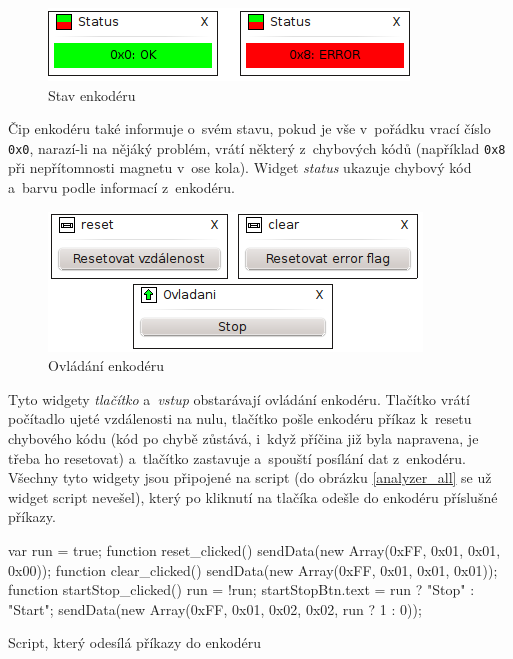 \documentclass[12pt, a4paper, oneside]{article}
\newcommand{\It}{\textit}  %
\begin{document}
\begin{figure}[H]
\begin{center}
\includegraphics[width=\textwidth]{img/enc_status.png}
\caption{Stav enkodéru}
\end{center}
\end{figure}
Čip enkodéru také informuje o~svém stavu, pokud je vše v~pořádku vrací číslo \verb|0x0|, narazí-li na nějáký problém, vrátí některý z~chybových kódů (například \verb|0x8| při nepřítomnosti magnetu v~ose kola). Widget \It{status} ukazuje chybový kód a~barvu podle informací z~enkodéru.

\begin{figure}[H]
\begin{center}
\includegraphics[width=\textwidth-50pt]{img/enc_ctrl.png}
\caption{Ovládání enkodéru}
\end{center}
\end{figure}
Tyto widgety \It{tlačítko} a~\It{vstup} obstarávají ovládání enkodéru. Tlačítko  vrátí počítadlo ujeté vzdálenosti na nulu, tlačítko  pošle enkodéru příkaz k~resetu chybového kódu (kód po chybě zůstává, i~když příčina již byla napravena, je třeba ho resetovat) a~tlačítko  zastavuje a~spouští posílání dat z~enkodéru. Všechny tyto widgety jsou připojené na script (do obrázku \ref{analyzer_all} se už widget script nevešel), který po kliknutí na tlačíka odešle do enkodéru příslušné příkazy.
\begin{listing}[H]
\begin{jscode}
var run = true;
function reset_clicked() {
    sendData(new Array(0xFF, 0x01, 0x01, 0x00));
}
function clear_clicked() {
    sendData(new Array(0xFF, 0x01, 0x01, 0x01));
}
function startStop_clicked() {
    run = !run;
    startStopBtn.text = run ? "Stop" : "Start";
    sendData(new Array(0xFF, 0x01, 0x02, 0x02, run ? 1 : 0));
}
\end{jscode}
\caption{Script, který odesílá příkazy do enkodéru}
\end{listing}
\end{document}

